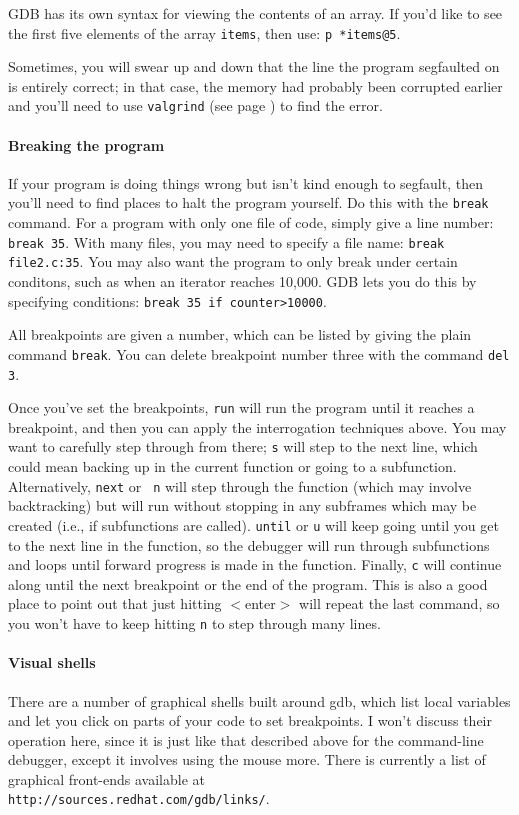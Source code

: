 \documentclass[12pt]{article}
\begin{document}
GDB has its own syntax for viewing the contents of an array. If you'd
like to see the first five elements of the array {\tt items}, then use:
{\tt p *items@5}.

Sometimes, you will swear up and down that the line the program segfaulted on is
entirely correct; in that case, the memory had probably been corrupted earlier and
you'll need to use {\tt valgrind} (see page \pageref{valgrind}) to find the error.

\paragraph{Breaking the program} If your program is doing things wrong but isn't kind
enough to segfault, then you'll need to find places to halt the program
yourself. Do this with the {\tt break} command. For a program with only
one file of code, simply give a line number: {\tt break 35}. With many
files, you may need to specify a file name: {\tt break file2.c:35}. You
may also want the program to only break under certain conditons, such
as when an iterator reaches 10,000. GDB lets you do this by specifying
conditions: {\tt break 35 if counter>10000}.

All breakpoints are given a number, which can be listed by giving the
plain command {\tt break}. You can delete breakpoint number three with
the command {\tt del 3}.

Once you've set the breakpoints, {\tt run} will run the program until it
reaches a breakpoint, and then you can apply the interrogation techniques
above. You may want to carefully step through from there; {\tt s}
will step to the next line, which could mean backing up in the current
function or going to a subfunction. Alternatively, {\tt next} or {\tt
n} will step through the function (which may involve backtracking) but
will run without stopping in any subframes which may be created
(i.e., if subfunctions are called).  {\tt until} or {\tt u} will keep
going until you get to the next line in the function, so the debugger
will run through subfunctions and loops until forward progress is made
in the function.  Finally, {\tt c} will continue along until the next
breakpoint or the end of the program. This is also a good place to
point out that just hitting $<$enter$>$ will repeat the last command,
so you won't have to keep hitting {\tt n} to step through many lines.


\paragraph{Visual shells} There are a number of graphical shells built
around gdb, which list local variables and let you click on parts of
your code to set breakpoints. I won't discuss their operation here, since 
it is just like that described above for the command-line debugger, except
it involves using the mouse more. There is currently a list of graphical
front-ends available at\\ {\tt http://sources.redhat.com/gdb/links/}.
\end{document}

